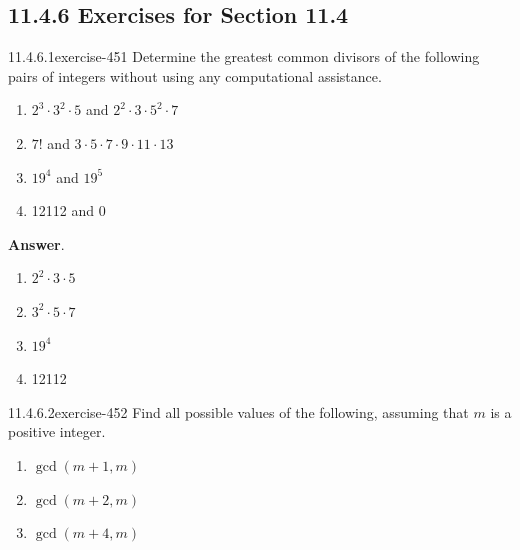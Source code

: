 \documentclass[twoside,10pt,]{book}
\numberwithin{equation}{section}
\begin{document}
\subsection*{11.4.6 Exercises for Section 11.4}
\begin{divisionsolution}{11.4.6.1}{}{exercise-451}%
\hypertarget{p-4012}{}%
Determine the greatest common divisors of the following pairs of integers without using any computational assistance.\leavevmode%
\begin{enumerate}[label=(\alph*)]
\item\hypertarget{li-1808}{}\hypertarget{p-4013}{}%
\(2^3 \cdot 3^2\cdot 5\)   and  \(2^2 \cdot 3 \cdot 5^2\cdot 7\)%
\item\hypertarget{li-1809}{}\hypertarget{p-4014}{}%
\(7! \)  and  \(3\cdot 5\cdot 7\cdot 9\cdot 11\cdot 13\)%
\item\hypertarget{li-1810}{}\hypertarget{p-4015}{}%
\(19^4\)  and  \(19^5\)%
\item\hypertarget{li-1811}{}\hypertarget{p-4016}{}%
12112 and 0%
\end{enumerate}
%
\par\smallskip%
\noindent\textbf{Answer}.\quad%
\hypertarget{p-4017}{}%
\leavevmode%
\begin{enumerate}[label=(\alph*)]
\item\hypertarget{li-1812}{}\hypertarget{p-4018}{}%
\(2^2 \cdot 3 \cdot 5\)%
\item\hypertarget{li-1813}{}\hypertarget{p-4019}{}%
\(3^2 \cdot 5\cdot 7\)%
\item\hypertarget{li-1814}{}\hypertarget{p-4020}{}%
\(19^4\)%
\item\hypertarget{li-1815}{}\hypertarget{p-4021}{}%
12112%
\end{enumerate}
%
\end{divisionsolution}%
\begin{divisionsolution}{11.4.6.2}{}{exercise-452}%
\hypertarget{p-4022}{}%
Find all possible values of the following, assuming that \(m\) is a positive integer.\leavevmode%
\begin{enumerate}[label=(\alph*)]
\item\hypertarget{li-1816}{}\hypertarget{p-4023}{}%
\(\gcd(m+1,m)\)%
\item\hypertarget{li-1817}{}\hypertarget{p-4024}{}%
\(\gcd(m+2,m)\)%
\item\hypertarget{li-1818}{}\hypertarget{p-4025}{}%
\(\gcd(m+4,m)\)%
\end{enumerate}
%
\end{divisionsolution}%
\end{document}
